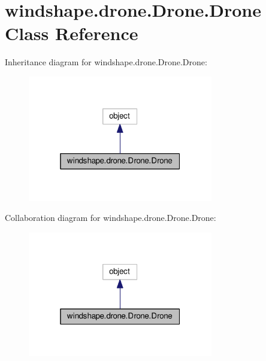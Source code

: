 \hypertarget{classwindshape_1_1drone_1_1_drone_1_1_drone}{}\section{windshape.\+drone.\+Drone.\+Drone Class Reference}
\label{classwindshape_1_1drone_1_1_drone_1_1_drone}


Inheritance diagram for windshape.\+drone.\+Drone.\+Drone\+:\nopagebreak
\begin{figure}[H]
\begin{center}
\leavevmode
\includegraphics[width=229pt]{classwindshape_1_1drone_1_1_drone_1_1_drone__inherit__graph}
\end{center}
\end{figure}


Collaboration diagram for windshape.\+drone.\+Drone.\+Drone\+:\nopagebreak
\begin{figure}[H]
\begin{center}
\leavevmode
\includegraphics[width=229pt]{classwindshape_1_1drone_1_1_drone_1_1_drone__coll__graph}
\end{center}
\end{figure}
